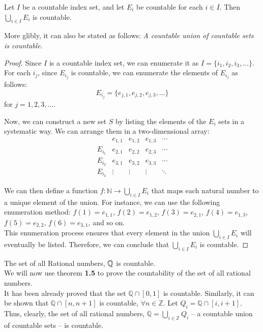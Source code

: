 \begin{theorem}
    Let \( I \) be a countable index set, and let \( E_i \) be countable for each \( i \in I \). Then \( \bigcup_{i \in I} E_i \) is countable.
\end{theorem}

More glibly, it can also be stated as follows: \textit{A countable union of countable sets is countable.}

\begin{proof}
    Since \( I \) is a countable index set, we can enumerate it as \( I = \{i_1, i_2, i_3, \ldots\} \). For each \( i_j \), since \( E_{i_j} \) is countable, we can enumerate the elements of \( E_{i_j} \) as follows:
\[
E_{i_j} = \{e_{j,1}, e_{j,2}, e_{j,3}, \ldots\}
\]
for \( j = 1, 2, 3, \ldots \).

Now, we can construct a new set \( S \) by listing the elements of the \( E_i \) sets in a systematic way. We can arrange them in a two-dimensional array:
\[
\begin{array}{c|cccc}
    & e_{1,1} & e_{1,2} & e_{1,3} & \cdots \\
    \hline
    E_{i_1} & e_{2,1} & e_{2,2} & e_{2,3} & \cdots \\
    E_{i_2} & e_{3,1} & e_{3,2} & e_{3,3} & \cdots \\
    E_{i_3} & \vdots & \vdots & \vdots & \ddots
\end{array}
\]

We can then define a function \( f : \mathbb{N} \to \bigcup_{i \in I} E_i \) that maps each natural number to a unique element of the union. For instance, we can use the following enumeration method:
\( f(1) = e_{1,1} \), 
\( f(2) = e_{1,2} \), 
\( f(3) = e_{2,1} \), 
\( f(4) = e_{1,3} \), 
\( f(5) = e_{2,2} \), 
\( f(6) = e_{3,1} \), 
and so on. \\

This enumeration process ensures that every element in the union \( \bigcup_{i \in I} E_i \) will eventually be listed. Therefore, we can conclude that \( \bigcup_{i \in I} E_i \) is countable.

\end{proof}

\begin{example}
    The set of all Rational numbers, $\mathbb{Q}$ is countable. \\

    We will now use theorem \textbf{1.5} to prove the countability of the set of all rational numbers. \\
    
    It has been already proved that the set \( \mathbb{Q} \cap [0, 1] \) is countable. Similarly, it can be shown that \( \mathbb{Q} \cap [n, n + 1] \) is countable, \( \forall n \in \mathbb{Z} \). Let \( Q_i = \mathbb{Q} \cap [i, i + 1] \). Thus, clearly, the set of all rational numbers, \( \mathbb{Q} = \bigcup_{i \in \mathbb{Z}} Q_i \) – a countable union of countable sets – is countable. \\

\end{example}

